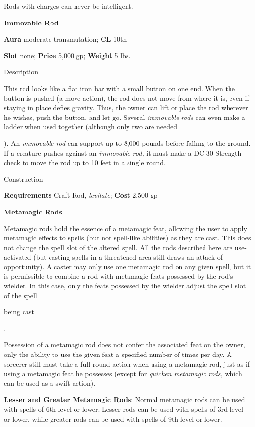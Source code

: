 Rods with charges can never be intelligent.
				
\textbf{Immovable Rod}
				
\textbf{Aura} moderate transmutation;\textbf{ CL }10th
				
\textbf{Slot} none; \textbf{Price} 5,000 gp; \textbf{Weight} 5 lbs.
				
Description
				
This rod looks like a flat iron bar with a small button on one end. When the button is pushed (a move action), the rod does not move from where it is, even if staying in place defies gravity. Thus, the owner can lift or place the rod wherever he wishes, push the button, and let go. Several \textit{immovable rods }can even make a ladder when used together (although only two 
are needed

). An \textit{immovable rod }can support up to 8,000 pounds before falling to the ground. If a creature pushes against an \textit{immovable rod, }it must make a DC 30 Strength check to move the rod up to 10 feet in a single round. 
				
Construction
				
\textbf{Requirements} Craft Rod, \textit{levitate}; \textbf{Cost }2,500 gp
				
\textbf{Metamagic Rods}
				
Metamagic rods hold the essence of a metamagic feat, allowing the user to apply metamagic effects to spells (but not spell-like abilities) as they are cast. This does not change the spell slot of the altered spell. All the rods described here are use-activated (but casting spells in a threatened area still draws an attack of opportunity). A caster may only use one metamagic rod on any given spell, but it is permissible to combine a rod with metamagic feats possessed by the rod's wielder. In this case, only the feats possessed by the wielder adjust the spell slot of the spell 

being cast

.
				
Possession of a metamagic rod does not confer the associated feat on the owner, only the ability to use the given feat a specified number of times per day. A sorcerer still must take a full-round action when using a metamagic rod, just as if using a metamagic feat he possesses (except for \textit{quicken metamagic rods,} which can be used as a swift action).
				
\textbf{Lesser and Greater Metamagic Rods}: Normal metamagic rods can be used with spells of 6th level or lower. Lesser rods can be used with spells of 3rd level or lower, while greater rods can be used with spells of 9th level or lower. 
				
